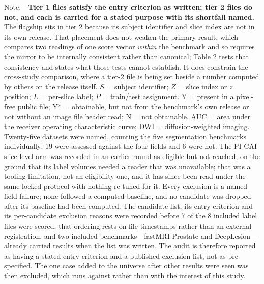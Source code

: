 \documentclass[11pt,letterpaper]{article}
\begin{document}
\begin{singlespace}
\vspace{0.4em}
{\scriptsize
Note.---\textbf{Tier 1 files satisfy the entry criterion as written; tier 2 files
do not, and each is carried for a stated purpose with its shortfall named.} The
flagship sits in tier 2 because its subject identifier and slice index are not in
its own release. That placement does not weaken the primary result, which
compares two readings of one score vector \emph{within} the benchmark and so
requires the mirror to be internally consistent rather than canonical; Table 2
tests that consistency and states what those tests cannot establish. It does
constrain the cross-study comparison, where a tier-2 file is being set beside a
number computed by others on the release itself. $S$ = subject identifier; $Z$ = slice index or $z$ position; $L$ =
per-slice label; $P$ = train/test assignment. Y = present in a pixel-free public
file; Y* = obtainable, but not from the benchmark's own release or not without an
image file header read; N = not obtainable. AUC = area under the receiver
operating characteristic curve; DWI = diffusion-weighted imaging. Twenty-five
datasets were named, counting the five segmentation benchmarks individually; 19
were assessed against the four fields and 6 were not. The PI-CAI slice-level arm
was recorded in an earlier round as eligible but not reached, on the ground that
its label volumes needed a reader that was unavailable; that was a tooling
limitation, not an eligibility one, and it has since been read under the same
locked protocol with nothing re-tuned for it. Every exclusion is a named
field failure; none followed a computed baseline, and no candidate was dropped
after its baseline had been computed. The candidate list, its entry criterion and
its per-candidate exclusion reasons were recorded before 7 of the 8 included label
files were scored; that ordering rests on file timestamps rather than an external
registration, and two included benchmarks---fastMRI Prostate and DeepLesion---
already carried results when the list was written. The audit is therefore reported
as having a stated entry criterion and a published exclusion list, not as
pre-specified. The one case added to the universe after other results were seen
was then excluded, which runs against rather than with the interest of this study.

}

\end{singlespace}
\end{document}
